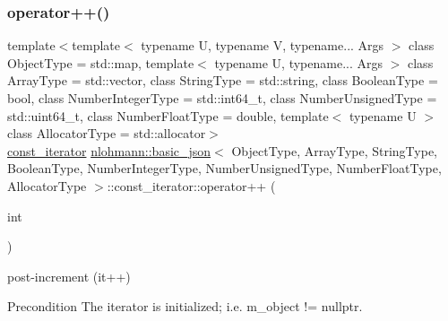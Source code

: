 \subsubsection{\texorpdfstring{operator++()}{operator++()}\hspace{0.1cm}{\footnotesize\ttfamily [1/2]}}
{\footnotesize\ttfamily template$<$template$<$ typename U, typename V, typename... Args $>$ class Object\+Type = std\+::map, template$<$ typename U, typename... Args $>$ class Array\+Type = std\+::vector, class String\+Type  = std\+::string, class Boolean\+Type  = bool, class Number\+Integer\+Type  = std\+::int64\+\_\+t, class Number\+Unsigned\+Type  = std\+::uint64\+\_\+t, class Number\+Float\+Type  = double, template$<$ typename U $>$ class Allocator\+Type = std\+::allocator$>$ \\
\hyperlink{classnlohmann_1_1basic__json_1_1const__iterator}{const\+\_\+iterator} \hyperlink{classnlohmann_1_1basic__json}{nlohmann\+::basic\+\_\+json}$<$ Object\+Type, Array\+Type, String\+Type, Boolean\+Type, Number\+Integer\+Type, Number\+Unsigned\+Type, Number\+Float\+Type, Allocator\+Type $>$\+::const\+\_\+iterator\+::operator++ (\begin{DoxyParamCaption}\item[{int}]{ }\end{DoxyParamCaption})\hspace{0.3cm}{\ttfamily [inline]}}



post-\/increment (it++) 

\begin{DoxyPrecond}{Precondition}
The iterator is initialized; i.\+e. {\ttfamily m\+\_\+object != nullptr}. 
\end{DoxyPrecond}
\hypertarget{classnlohmann_1_1basic__json_1_1const__iterator_a8fbb15efd97599209a7def77af8e748e}{}\label{classnlohmann_1_1basic__json_1_1const__iterator_a8fbb15efd97599209a7def77af8e748e} 
